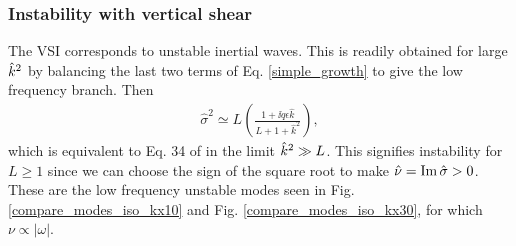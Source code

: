 \subsubsection{Instability with vertical shear}
The VSI corresponds to unstable inertial waves. This
is readily obtained for large $\hat{k}^2$ by balancing
the last two terms of Eq. \ref{simple_growth} to give the low
frequency branch. Then 
\begin{align}
  \hat{\sigma}^2 \simeq L\left(\frac{1+\ii q \epsilon
       \hat{k}}{L+1+\hat{k}^2}\right), \label{simple_growth2}
\end{align}
which is equivalent to Eq. 34 of \cite{barker15} in the limit
$\hat{k}^2\gg L$. This signifies instability for
$L\geq1$ since we can choose the sign 
of the square root to make $\hat{\nu} = \operatorname{Im}\hat{\sigma}>0$.  These
are the low frequency unstable modes seen in
Fig. \ref{compare_modes_iso_kx10} and
Fig. \ref{compare_modes_iso_kx30}, for which $\nu\propto|\omega|$.  












